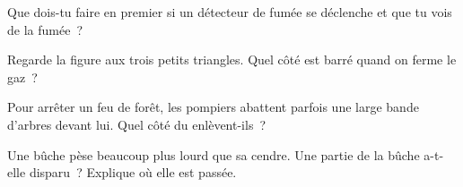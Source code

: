 \begin{exercise}[$\star$]\label{exo:g4:what-a-fire-needs:8}
Que dois-tu faire en premier si un détecteur de fumée se déclenche et
que tu vois de la fumée~?
\end{exercise}

\begin{exercise}[$\star$]\label{exo:g4:what-a-fire-needs:9}
Regarde la figure aux trois petits triangles. Quel côté est barré quand
on ferme le gaz~?
\end{exercise}

\begin{exercise}[$\star\star$]\label{exo:g4:what-a-fire-needs:10}
Pour arrêter un feu de forêt, les pompiers abattent parfois une large
bande d'arbres devant lui. Quel côté du  enlèvent-ils~?
\end{exercise}

\begin{exercise}[$\star\star$]\label{exo:g4:what-a-fire-needs:11}
Une bûche pèse beaucoup plus lourd que sa cendre. Une partie de la bûche
a-t-elle disparu~? Explique où elle est passée.
\end{exercise}
